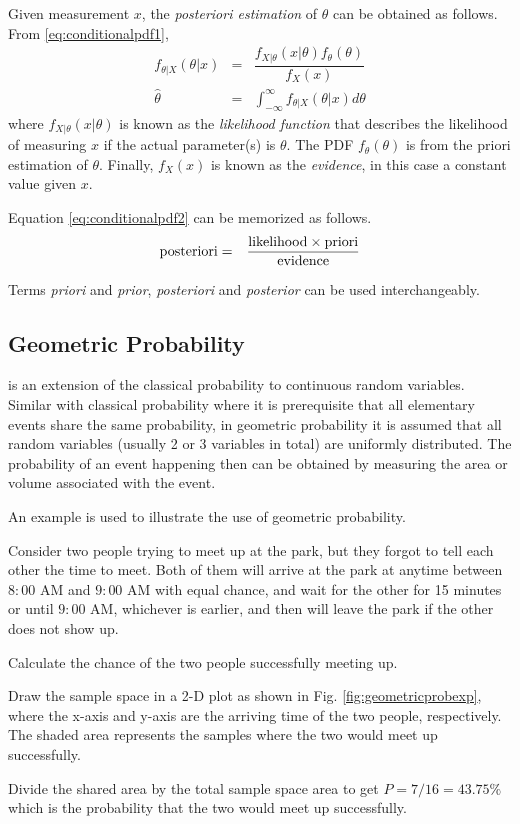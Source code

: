 Given measurement $x$, the \textit{posteriori estimation} of $\theta$ can be obtained as follows. From \eqref{eq:conditionalpdf1},
\begin{eqnarray}
  f_{\theta|X}(\theta|x) &=& \dfrac{f_{X|\theta}(x|\theta)f_\theta(\theta)}{f_X(x)} \label{eq:conditionalpdf2} \\
  \hat{\theta} &=& \int_{-\infty}^{\infty} f_{\theta|X}(\theta|x) d\theta \nonumber
\end{eqnarray}
where $f_{X|\theta}(x|\theta)$ is known as the \textit{likelihood function} that describes the likelihood of measuring $x$ if the actual parameter(s) is $\theta$. The PDF $f_\theta(\theta)$ is from the priori estimation of $\theta$. Finally, $f_X(x)$ is known as the \textit{evidence}, in this case a constant value given $x$.

Equation \eqref{eq:conditionalpdf2} can be memorized as follows.
\begin{eqnarray}
  \textup{posteriori} &=& \dfrac{\textup{likelihood}\times\textup{priori}}{\textup{evidence}} \nonumber
\end{eqnarray}


Terms \textit{priori} and \textit{prior}, \textit{posteriori} and \textit{posterior} can be used interchangeably.

\subsection{Geometric Probability}

 is an extension of the classical probability to continuous random variables. Similar with classical probability where it is prerequisite that all elementary events share the same probability, in geometric probability it is assumed that all random variables (usually 2 or 3 variables in total) are uniformly distributed. The probability of an event happening then can be obtained by measuring the area or volume associated with the event.

An example is used to illustrate the use of geometric probability.

\begin{shortbox}
Consider two people trying to meet up at the park, but they forgot to tell each other the time to meet. Both of them will arrive at the park at anytime between $8:00$ AM and $9:00$ AM with equal chance, and wait for the other for 15 minutes or until $9:00$ AM, whichever is earlier, and then will leave the park if the other does not show up.

Calculate the chance of the two people successfully meeting up.

Draw the sample space in a 2-D plot as shown in Fig. \ref{fig:geometricprobexp}, where the x-axis and y-axis are the arriving time of the two people, respectively. The shaded area represents the samples where the two would meet up successfully.

Divide the shared area by the total sample space area to get $P=7/16=43.75\%$ which is the probability that the two would meet up successfully.
\end{shortbox}

